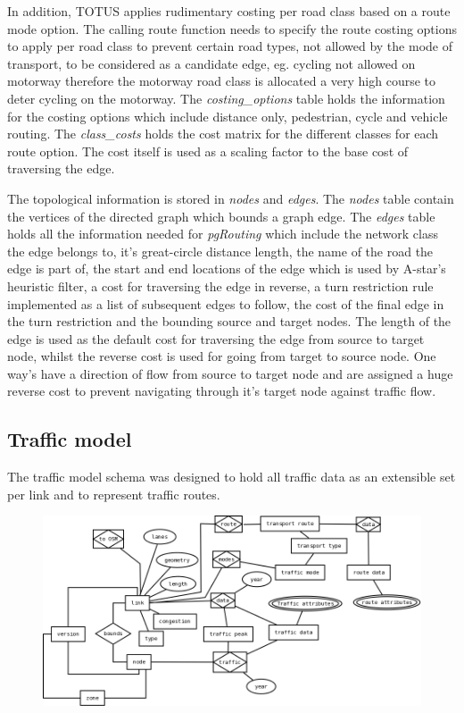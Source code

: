 In addition, TOTUS applies rudimentary costing per road class based on a
route mode option. The calling route function needs to specify the
route costing options to apply per road class to prevent certain road
types, not allowed by the mode of transport, to be considered as a
candidate edge, eg. cycling not allowed on motorway therefore the
motorway road class is allocated a very high course to deter cycling on
the motorway. The \textit{costing\_options} table holds the
information for the costing options which include distance only,
pedestrian, cycle and vehicle routing. The
\textit{class\_costs} holds the cost matrix for the
different classes for each route option. The cost itself is used as a
scaling factor to the base cost of traversing the edge.

The topological information is stored in \textit{nodes} and
\textit{edges}. The \textit{nodes} table contain
the vertices of the directed graph which bounds a graph edge. The
\textit{edges} table holds all the information needed for
\textit{pgRouting} which include the network class the edge
belongs to, it's great-circle distance length, the
name of the road the edge is part of, the start and end locations of
the edge which is used by A-star's heuristic filter, a
cost for traversing the edge in reverse, a turn restriction rule
implemented as a list of subsequent edges to follow, the cost of the
final edge in the turn restriction and the bounding source and target
nodes. The length of the edge is used as the default cost for
traversing the edge from source to target node, whilst the reverse cost
is used for going from target to source node. One
way's have a direction of flow from source to target
node and are assigned a huge reverse cost to prevent navigating through
it's target node against traffic flow.

\subsection{Traffic model}
The traffic model schema was designed to hold all traffic data as an
extensible set per link and to represent traffic routes.

\begin{figure}[h]
 \centering
 \includegraphics[scale=0.4,keepaspectratio=true]{./traffic_model.png}
\end{figure}


